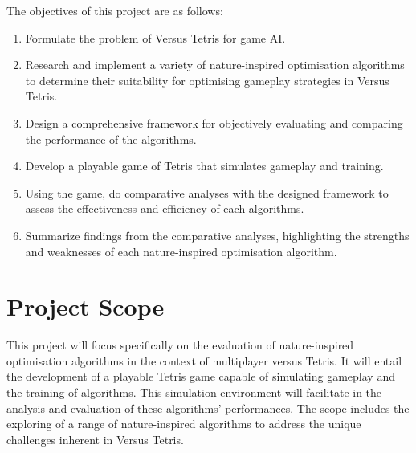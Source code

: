 \documentclass[a4paper, 12pt]{extreport}
\begin{document}
			The objectives of this project are as follows:
			
			\begin{enumerate}
				\item Formulate the problem of Versus Tetris for game AI.
				\item Research and implement a variety of nature-inspired optimisation algorithms to determine their suitability for optimising gameplay strategies in Versus Tetris.
				\item Design a comprehensive framework for objectively evaluating and comparing the performance of the algorithms.
				\item Develop a playable game of Tetris that simulates gameplay and training.
				\item Using the game, do comparative analyses with the designed framework to assess the effectiveness and efficiency of each algorithms.
				\item Summarize findings from the comparative analyses, highlighting the strengths and weaknesses of each nature-inspired optimisation algorithm.
			\end{enumerate}
		
		\section{Project Scope}
			
			
			This project will focus specifically on the evaluation of nature-inspired optimisation algorithms in the context of multiplayer versus Tetris. It will entail the development of a playable Tetris game capable of simulating gameplay and the training of algorithms. This simulation environment will facilitate in the analysis and evaluation of these algorithms' performances. The scope includes the exploring of a range of nature-inspired algorithms to address the unique challenges inherent in Versus Tetris.
			
		
	
\end{document}
